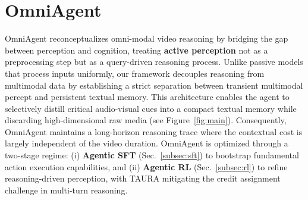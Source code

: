 \documentclass{article}
\theoremstyle{plain}
\theoremstyle{definition}
\theoremstyle{remark}
\begin{document}
\section{OmniAgent}
\label{sec:omniagent}
OmniAgent reconceptualizes omni-modal video reasoning by bridging the gap between perception and cognition, treating \textbf{active perception} not as a preprocessing step but as a query-driven reasoning process. Unlike passive models that process inputs uniformly, our framework decouples reasoning from multimodal data by establishing a strict separation between transient multimodal percept and persistent textual memory. This architecture enables the agent to selectively distill critical audio-visual cues into a compact textual memory while discarding high-dimensional raw media (see Figure~\ref{fig:main}). Consequently, OmniAgent maintains a long-horizon reasoning trace where the contextual cost is largely independent of the video duration.
OmniAgent is optimized through a two-stage regime: (i) \textbf{Agentic SFT} (Sec.~\ref{subsec:sft}) to bootstrap fundamental action execution capabilities, and 
(ii) \textbf{Agentic RL} (Sec.~\ref{subsec:rl}) to refine
reasoning-driven perception, with TAURA mitigating the credit assignment
challenge in multi-turn reasoning.
\end{document}
